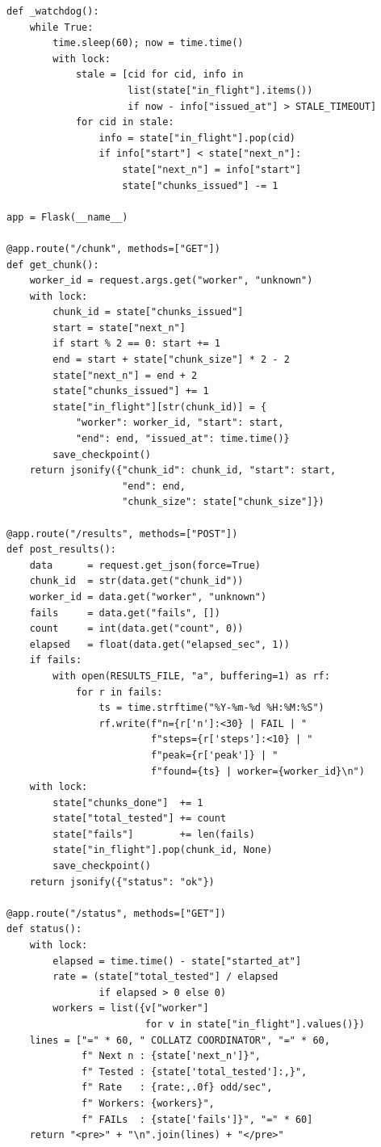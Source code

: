 \documentclass{mcom-l}
\theoremstyle{definition}
\theoremstyle{remark}
\numberwithin{equation}{section}
\begin{document}
\begin{lstlisting}[caption={Coordinator: chunk dispatch, checkpointing,
                             and results collection.},
                   label={lst:coordinator}]
def _watchdog():
    while True:
        time.sleep(60); now = time.time()
        with lock:
            stale = [cid for cid, info in
                     list(state["in_flight"].items())
                     if now - info["issued_at"] > STALE_TIMEOUT]
            for cid in stale:
                info = state["in_flight"].pop(cid)
                if info["start"] < state["next_n"]:
                    state["next_n"] = info["start"]
                    state["chunks_issued"] -= 1

app = Flask(__name__)

@app.route("/chunk", methods=["GET"])
def get_chunk():
    worker_id = request.args.get("worker", "unknown")
    with lock:
        chunk_id = state["chunks_issued"]
        start = state["next_n"]
        if start % 2 == 0: start += 1
        end = start + state["chunk_size"] * 2 - 2
        state["next_n"] = end + 2
        state["chunks_issued"] += 1
        state["in_flight"][str(chunk_id)] = {
            "worker": worker_id, "start": start,
            "end": end, "issued_at": time.time()}
        save_checkpoint()
    return jsonify({"chunk_id": chunk_id, "start": start,
                    "end": end,
                    "chunk_size": state["chunk_size"]})

@app.route("/results", methods=["POST"])
def post_results():
    data      = request.get_json(force=True)
    chunk_id  = str(data.get("chunk_id"))
    worker_id = data.get("worker", "unknown")
    fails     = data.get("fails", [])
    count     = int(data.get("count", 0))
    elapsed   = float(data.get("elapsed_sec", 1))
    if fails:
        with open(RESULTS_FILE, "a", buffering=1) as rf:
            for r in fails:
                ts = time.strftime("%Y-%m-%d %H:%M:%S")
                rf.write(f"n={r['n']:<30} | FAIL | "
                         f"steps={r['steps']:<10} | "
                         f"peak={r['peak']} | "
                         f"found={ts} | worker={worker_id}\n")
    with lock:
        state["chunks_done"]  += 1
        state["total_tested"] += count
        state["fails"]        += len(fails)
        state["in_flight"].pop(chunk_id, None)
        save_checkpoint()
    return jsonify({"status": "ok"})

@app.route("/status", methods=["GET"])
def status():
    with lock:
        elapsed = time.time() - state["started_at"]
        rate = (state["total_tested"] / elapsed
                if elapsed > 0 else 0)
        workers = list({v["worker"]
                        for v in state["in_flight"].values()})
    lines = ["=" * 60, " COLLATZ COORDINATOR", "=" * 60,
             f" Next n : {state['next_n']}",
             f" Tested : {state['total_tested']:,}",
             f" Rate   : {rate:,.0f} odd/sec",
             f" Workers: {workers}",
             f" FAILs  : {state['fails']}", "=" * 60]
    return "<pre>" + "\n".join(lines) + "</pre>"


\end{lstlisting}
\end{document}
